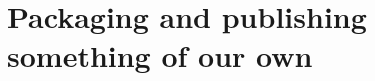\chapter{Packaging and publishing something of our own}
\label{ch:packaging-and-publishing-something-of}

